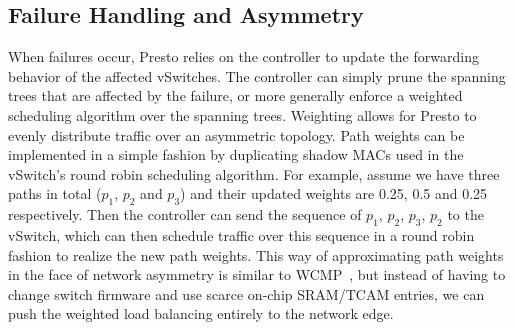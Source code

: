 


\subsection{Failure Handling and Asymmetry}
When failures occur, Presto relies on the controller to update the forwarding
behavior of the affected vSwitches. The controller can simply prune the spanning
trees that are affected by the failure, or more generally enforce a weighted
scheduling algorithm over the spanning trees.
Weighting allows for Presto to evenly distribute traffic over an asymmetric topology.
Path weights can be implemented in a simple fashion by duplicating shadow MACs used in
the vSwitch's round robin scheduling algorithm.
For example, assume we have three paths in total ($p_1$, $p_2$ and $p_3$) and their updated weights are 0.25, 0.5 and 0.25 respectively.
Then the controller can send the sequence of $p_1$, $p_2$, $p_3$, $p_2$ to the vSwitch, which
can then schedule traffic over this sequence in a round robin fashion to realize the new path weights.
This way of approximating path weights in the face of network
asymmetry is similar to WCMP~\cite{wcmp}, but instead of having to change switch firmware and use
scarce on-chip SRAM/TCAM entries, we can push the weighted load balancing entirely to the network edge.

